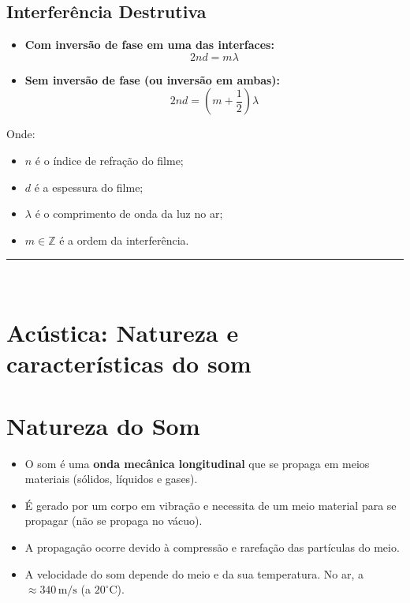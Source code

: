 \documentclass[a4paper,12pt]{article}
\begin{document}
\begin{multicols}{2}
\subsection*{Interferência Destrutiva}

\begin{itemize}
  \item \textbf{Com inversão de fase em uma das interfaces:}
  \[
  2nd = m \lambda
  \]
  
  \item \textbf{Sem inversão de fase (ou inversão em ambas):}
  \[
  2nd = \left( m + \frac{1}{2} \right) \lambda
  \]
\end{itemize}

\noindent Onde:
\begin{itemize}
  \item \( n \) é o índice de refração do filme;
  \item \( d \) é a espessura do filme;
  \item \( \lambda \) é o comprimento de onda da luz no ar;
  \item \( m \in \mathbb{Z} \) é a ordem da interferência.
\end{itemize}

\noindent\rule{\linewidth}{1pt}\\

\section{Acústica: Natureza e características do som}

\section{Natureza do Som}
\begin{itemize}
    \item O som é uma \textbf{onda mecânica longitudinal} que se propaga em meios materiais (sólidos, líquidos e gases).
    \item É gerado por um corpo em vibração e necessita de um meio material para se propagar (não se propaga no vácuo).
    \item A propagação ocorre devido à compressão e rarefação das partículas do meio.
    \item A velocidade do som depende do meio e da sua temperatura. No ar, a $\approx 340\,\text{m/s}$ (a $20^\circ$C).
\end{itemize}


\end{multicols}
\end{document}
